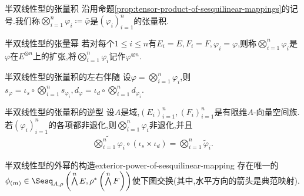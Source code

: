 \begin{definition}{半双线性型的张量积}{}
	沿用命题\ref{prop:tensor-product-of-sesquilinear-mappings}的记号.我们称$\bigotimes\limits_{i=1}^{n}\varphi_{i}\coloneq\bar{\varphi}$是$\left(\varphi_{i}\right)_{i=1}^{n}$的张量积.
\end{definition}

\begin{definition}{半双线性型的张量幂}{}
	若对每个$1\leq i\leq n$有$E_{i}=E,F_{i}=F,\varphi_{i}=\varphi$,则称$\bigotimes\limits_{i=1}^{n}\varphi_{i}$是$\varphi$在$E^{\otimes n}$上的扩张,将$\bigotimes\limits_{i=1}^{n}\varphi_{i}$记作$\varphi^{\otimes n}$.
\end{definition}

\begin{proposition}{半双线性型的张量积的左右伴随}{}
	设$\varphi=\bigotimes\limits_{i=1}^{n}\varphi_{i}$,则$s_{\varphi}=\iota_{s}\circ\bigotimes\limits_{i=1}^{n}s_{\varphi_{i}},d_{\varphi}=\iota_{d}\circ\bigotimes\limits_{i=1}^{n}d_{\varphi_{i}}$.
\end{proposition}

\begin{proposition}{半双线性型的张量积的逆型}{}
	设$A$是域,$\left(E_{i}\right)_{i=1}^{n},\left(F_{i}\right)_{i=1}^{n}$是有限维$A$-向量空间族.若$\left(\varphi_{i}\right)_{i=1}^{n}$的各项都非退化,则$\bigotimes\limits_{i=1}^{n}\varphi_{i}$非退化,并且
	\begin{align*}
		\widetilde{\bigotimes\limits_{i=1}^{n}\varphi_{i}}\circ\left(\iota_{s}\times\iota_{d}\right)=\bigotimes\limits_{i=1}^{n}\tilde{\varphi}_{i}.
	\end{align*}
\end{proposition}

\begin{proposition}{半双线性型的外幂的构造}{exterior-power-of-sesquilinear-mapping}
	存在唯一的$\phi_{\left(m\right)}\in\Sesq_{A,\rho}\left(\bigwedge\limits^{n}E,\rho^{\ast}\left(\bigwedge\limits^{n}F\right)\right)$使下图交换(其中,水平方向的箭头是典范映射).
	\begin{center}
	\end{center}
\end{proposition}

